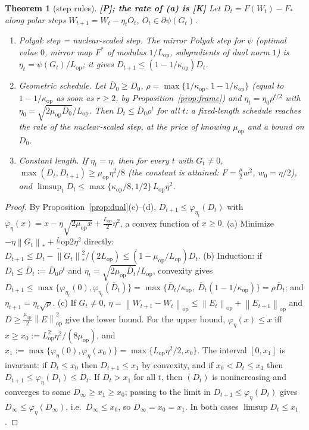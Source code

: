 \documentclass[11pt]{article}
\newtheorem{theorem}{Theorem}[section]
\theoremstyle{definition}
\theoremstyle{remark}
\newcommand{\nop}[1]{\left\|#1\right\|_{\mathrm{op}}}
\newcommand{\nnuc}[1]{\left\|#1\right\|_{*}}
\newcommand{\Lop}{L_{\mathrm{op}}}
\newcommand{\muop}{\mu_{\mathrm{op}}}
\newcommand{\kop}{\kappa_{\mathrm{op}}}
\begin{document}
\begin{theorem}[step rules]\label{thm:steps} \textbf{[P]; the rate of (a) is [K]}
Let $D_t=F(W_t)-F_\ast$ along polar steps $W_{t+1}=W_t-\eta_tO_t$, $O_t\in\partial\psi(G_t)$.
\begin{enumerate}[label=(\alph*)]
\item \emph{Polyak step = nuclear-scaled step.} The mirror Polyak step for $\psi$ (optimal value $0$, mirror map $F^\ast$
of modulus $1/\Lop$, subgradients of dual norm $1$) is $\eta_t=\psi(G_t)/\Lop$; it gives $D_{t+1}\le(1-1/\kop)D_t$.
\item \emph{Geometric schedule.} Let $\bar D_0\ge D_0$, $\rho=\max\{1/\kop,\,1-1/\kop\}$ (equal to $1-1/\kop$ as soon as
$r\ge2$, by Proposition~\ref{prop:frame}) and $\eta_t=\eta_0\rho^{t/2}$ with $\eta_0=\sqrt{2\muop\bar D_0}/\Lop$. Then
$D_t\le\bar D_0\rho^t$ for all $t$: a fixed-length schedule reaches the rate of the nuclear-scaled step, at the price of
knowing $\muop$ and a bound on $D_0$.
\item \emph{Constant length.} If $\eta_t=\eta$, then for every $t$ with $G_t\ne0$, $\max(D_t,D_{t+1})\ge\muop\eta^2/8$
(the constant is attained: $F=\frac\mu2w^2$, $w_0=\eta/2$), and
$\limsup_tD_t\le\max\{\kop/8,1/2\}\,\Lop\eta^2$.
\end{enumerate}
\end{theorem}
\begin{proof}
By Proposition~\ref{prop:dual}(c)--(d), $D_{t+1}\le\varphi_{\eta_t}(D_t)$ with
$\varphi_\eta(x)=x-\eta\sqrt{2\muop x}+\frac{\Lop}2\eta^2$, a convex function of $x\ge0$.
(a) Minimize $-\eta\nnuc{G_t}+\frac\Lop2\eta^2$ directly:
$D_{t+1}\le D_t-\nnuc{G_t}^2/(2\Lop)\le(1-\muop/\Lop)D_t$.
(b) Induction: if $D_t\le\bar D_t:=\bar D_0\rho^t$ and $\eta_t=\sqrt{2\muop\bar D_t}/\Lop$, convexity gives
$D_{t+1}\le\max\{\varphi_{\eta_t}(0),\varphi_{\eta_t}(\bar D_t)\}=\max\{\bar D_t/\kop,\ \bar D_t(1-1/\kop)\}=\rho\bar D_t$;
and $\eta_{t+1}=\eta_t\sqrt\rho$.
(c) If $G_t\ne0$, $\eta=\nop{W_{t+1}-W_t}\le\nop{E_t}+\nop{E_{t+1}}$ and $D\ge\frac{\muop}2\nop E^2$ give the lower bound.
For the upper bound, $\varphi_\eta(x)\le x$ iff $x\ge x_0:=\Lop^2\eta^2/(8\muop)$, and
$x_1:=\max\{\varphi_\eta(0),\varphi_\eta(x_0)\}=\max\{\Lop\eta^2/2,x_0\}$. The interval $[0,x_1]$ is invariant: if
$D_t\le x_0$ then $D_{t+1}\le x_1$ by convexity, and if $x_0<D_t\le x_1$ then $D_{t+1}\le\varphi_\eta(D_t)\le D_t$. If
$D_t>x_1$ for all $t$, then $(D_t)$ is nonincreasing and converges to some $D_\infty\ge x_1\ge x_0$; passing to the
limit in $D_{t+1}\le\varphi_\eta(D_t)$ gives $D_\infty\le\varphi_\eta(D_\infty)$, i.e.\ $D_\infty\le x_0$, so
$D_\infty=x_0=x_1$. In both cases $\limsup D_t\le x_1$.
\end{proof}
\end{document}
